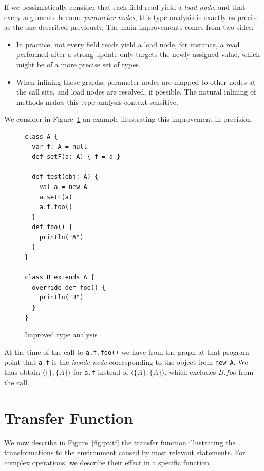 If we pessimistically consider that each field read yield a \emph{load node},
and that every arguments become \emph{parameter nodes}, this type analysis is
exactly as precise as the one described previously. The main improvements comes
from two sides:
\begin{itemize}
    \item In practice, not every field reads yield a load node, for instance, a
read performed after a strong update only targets the newly assigned value,
which might be of a more precise set of types.
    \item When inlining those graphs, parameter nodes are mapped to other nodes
at the call site, and load nodes are resolved, if possible. The natural
inlining of methods makes this type analysis context sensitive. 
\end{itemize}
We consider in Figure~\ref{fig:pt:precise} an example illustrating this
improvement in precision.

\begin{figure}[h]
    \centering
\begin{lstlisting}
class A {
  var f: A = null
  def setF(a: A) { f = a }

  def test(obj: A) {
    val a = new A
    a.setF(a)
    a.f.foo()
  }
  def foo() {
    println("A")
  }
}

class B extends A {
  override def foo() {
    println("B")
  }
}
\end{lstlisting}
    \caption{Improved type analysis}
    \label{fig:pt:precise}
\end{figure}

At the time of the call to \verb/a.f.foo()/ we have from the graph at that
program point that \verb/a.f/ is the \emph{inside node} corresponding to the
object from \verb/new A/. We thus obtain $\langle \{\}, \{A\} \rangle$ for \verb/a.f/ instead of
$\langle \{A\}, \{A\} \rangle$, which excludes $B.foo$ from the call.
\section{Transfer Function}
We now describe  in Figure~\ref{fig:pt:tf} the transfer function illustrating
the transformations to the environment caused by most relevant statements. For
complex operations, we describe their effect in a specific function.

